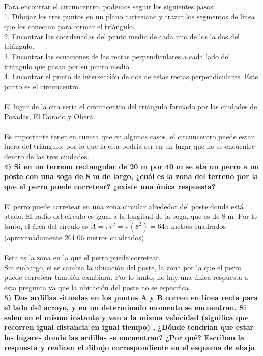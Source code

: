 \documentclass{article}
\begin{document}
Para encontrar el circuncentro, podemos seguir los siguientes pasos:\\
1. Dibujar los tres puntos en un plano cartesiano y trazar los segmentos de línea que los conectan para formar el triángulo.\\
2. Encontrar las coordenadas del punto medio de cada uno de los la dos del triángulo.\\
3. Encontrar las ecuaciones de las rectas perpendiculares a cada lado del triángulo que pasan por su punto medio.\\
4. Encontrar el punto de intersección de dos de estas rectas perpendiculares. Este punto es el circuncentro.\\
\\
El lugar de la cita sería el circuncentro del triángulo formado por las ciudades de Posadas, El Dorado y Oberá.\\
\\
Es importante tener en cuenta que en algunos casos, el circuncentro puede estar fuera del triángulo, por lo que la cita podría ser en un lugar que no se encuentre dentro de las tres ciudades.\\



{\bf 4) Si en un terreno rectangular de 20 m por 40 m se ata un perro a un poste con una soga de 8 m de largo, ¿cuál es la zona del terreno por la que el perro puede corretear? ¿existe una única respuesta? } \\ \\

El perro puede corretear en una zona circular alrededor del poste donde está atado. El radio del círculo es igual a la longitud de la soga, que es de 8 m. Por lo tanto, el área del círculo es $A = \pi r^2 = \pi(8^2) = 64\pi$ metros cuadrados (aproximadamente 201.06 metros cuadrados). \\ \\
Esta es la zona en la que el perro puede corretear.
\\
Sin embargo, si se cambia la ubicación del poste, la zona por la que el perro puede corretear también cambiará. Por lo tanto, no hay una única respuesta a esta pregunta ya que la ubicación del poste no se especifica.\\

{\bf 5) Dos ardillas situadas en los puntos A y B corren en línea recta para el lado del arroyo, y en un determinado momento se encuentran. Si salen en el mismo instante y van a la misma velocidad (significa que recorren igual distancia en igual tiempo) , ¿Dónde tendrían que estar los lugares donde las ardillas se encuentran? ¿Por qué? Escriban la respuesta y realicen el dibujo correspondiente en el esquema de abajo } \\ \\
\end{document}
